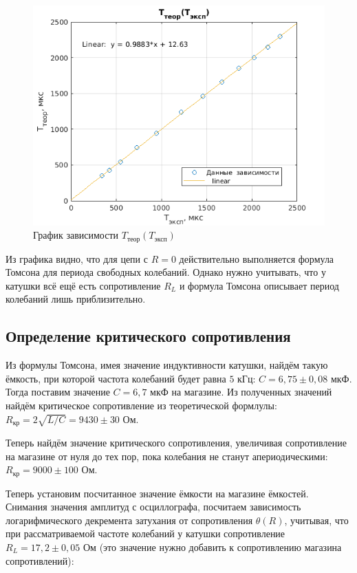 \begin{figure}[h!]
    \centering
    \includegraphics[width = 12 cm]{images/exp1.png}
    \caption{График зависимости $T_{\text{теор}}(T_{\text{эксп}})$}
    \label{exp1}
\end{figure}

Из графика видно, что для цепи с $R = 0$ действительно выполняется формула Томсона для периода свободных колебаний. Однако нужно учитывать, что у катушки всё ещё есть сопротивление $R_L$ и формула Томсона описывает период колебаний лишь приблизительно.

\subsection{Определение критического сопротивления}

Из формулы Томсона, имея значение индуктивности катушки, найдём такую ёмкость, при которой частота колебаний будет равна $5$ кГц: $C = 6,75 \pm 0,08$ мкФ. Тогда поставим значение $C = 6,7$ мкФ на магазине. Из полученных значений найдём критическое сопротивление из теоретической формлулы: $R_{\text{кр}} = 2 \sqrt{L/C} = 9430 \pm 30$ Ом.

Теперь найдём значение критического сопротивления, увеличивая сопротивление на магазине от нуля до тех пор, пока колебания не станут апериодическими: $R_{\text{кр}} = 9000 \pm 100$ Ом.

Теперь установим посчитанное значение ёмкости на магазине ёмкостей. Снимания значения амплитуд с осциллографа, посчитаем зависимость логарифмического декремента затухания от сопротивления $\theta (R)$, учитывая, что при рассматриваемой частоте колебаний у катушки сопротивление $R_L = 17,2 \pm 0,05$ Ом (это значение нужно добавить к сопротивлению магазина сопротивлений):

